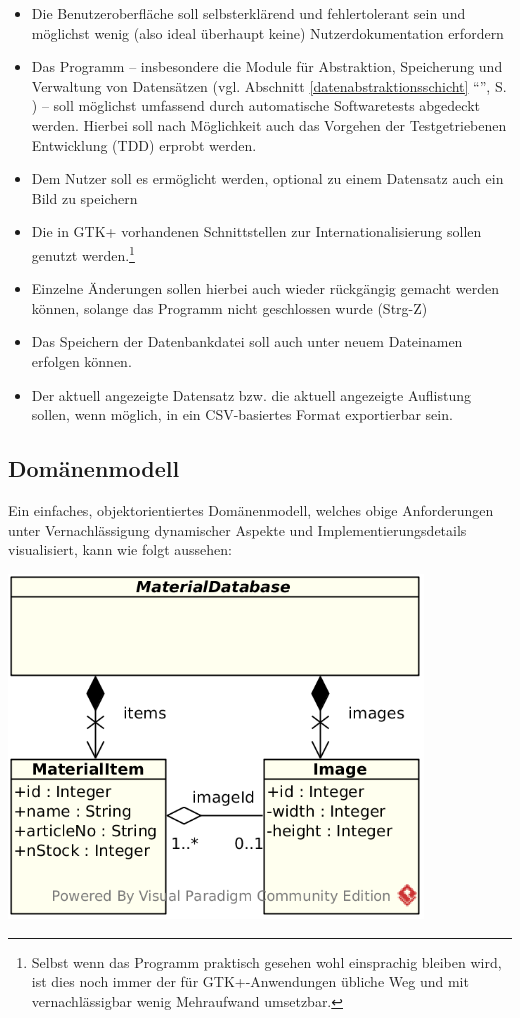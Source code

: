 \begin{itemize}
\item Die Benutzeroberfläche soll selbsterklärend und fehlertolerant sein und möglichst wenig (also ideal überhaupt keine)
Nutzerdokumentation erfordern
\item Das Programm -- insbesondere die Module für Abstraktion, Speicherung und Verwaltung von Datensätzen (vgl.
Abschnitt \ref{datenabstraktionsschicht} ``'', S. \pageref{datenabstraktionsschicht})
-- soll möglichst umfassend durch automatische Softwaretests abgedeckt werden.
Hierbei soll nach Möglichkeit auch das Vorgehen der Testgetriebenen Entwicklung (TDD) erprobt werden.
\item Dem Nutzer soll es ermöglicht werden, optional zu einem Datensatz auch ein Bild zu speichern
\item Die in GTK+ vorhandenen Schnittstellen zur Internationalisierung sollen genutzt werden.\footnote{Selbst wenn das
Programm praktisch gesehen wohl einsprachig bleiben wird, ist dies noch immer der für GTK+-Anwendungen übliche Weg
und mit vernachlässigbar wenig Mehraufwand umsetzbar.}
\item Einzelne Änderungen sollen hierbei auch wieder rückgängig gemacht werden können, solange das Programm nicht
geschlossen wurde (Strg-Z)
\item Das Speichern der Datenbankdatei soll auch unter neuem Dateinamen erfolgen können.
\item Der aktuell angezeigte Datensatz bzw. die aktuell angezeigte Auflistung sollen, wenn möglich, in ein CSV-basiertes
Format exportierbar sein.
\end{itemize}

\newpage
\subsection{Domänenmodell}
Ein einfaches, objektorientiertes Domänenmodell, welches obige Anforderungen unter Vernachlässigung dynamischer Aspekte
und Implementierungsdetails visualisiert, kann wie folgt aussehen:

\begin{center}
\noindent\includegraphics[width=110mm,keepaspectratio]{images/01-domaenenmodell.png}
\end{center}


